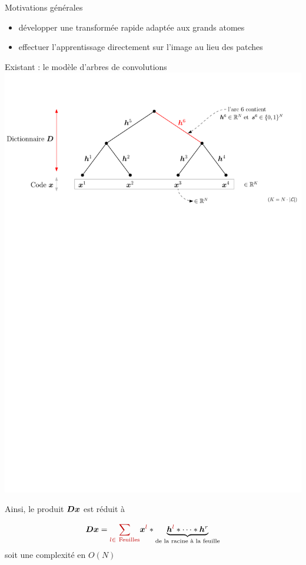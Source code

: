 \begin{frame}{Motivations générales}
	\begin{itemize}
		\item développer une \alert{transformée rapide} adaptée aux grands atomes
		\item effectuer l'apprentissage \alert{directement sur l'image} au lieu des patches
	\end{itemize}
\end{frame}



\begin{frame}{Existant : le modèle d'arbres de convolutions}
\includegraphics[width=\textwidth]{figures/tree.pdf}

Ainsi, le produit $\bm{D}\bm{x}$ est réduit à

\begin{equation}
\D \x = \Req{\sum_{l \in ~\text{Feuilles}}} \x^{\Req{l}} * \underbrace{\h^{\Req{l}}* \dots* \h^{r}}_{\textrm{de la racine à la feuille}}
\end{equation}
soit une complexité en \alert{$O(N)$}

\end{frame}


